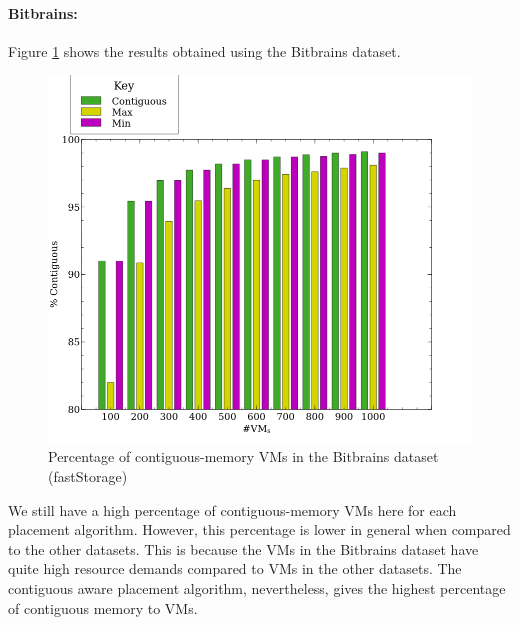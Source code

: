 \documentclass[sigconf]{sigplanconf}
\begin{document}
  \paragraph{Bitbrains:} 
  Figure \ref{fig:cerit_res} shows the results obtained using the Bitbrains dataset.
  \begin{figure}[!h]
  	\centering
  	\includegraphics[scale=0.35]{bitbrains-fast.png}
  	\caption{Percentage of contiguous-memory VMs in the Bitbrains dataset (fastStorage)}
  	\label{fig:cerit_res}
  \end{figure}
  \newline
  We still have a high percentage of contiguous-memory VMs here for each placement algorithm. However, this percentage is lower in general when compared to the other datasets. This is because the VMs in the Bitbrains dataset have quite high resource demands compared to VMs in the other datasets. The contiguous aware placement algorithm, nevertheless, gives the highest percentage of contiguous memory to VMs.
  
\end{document}
